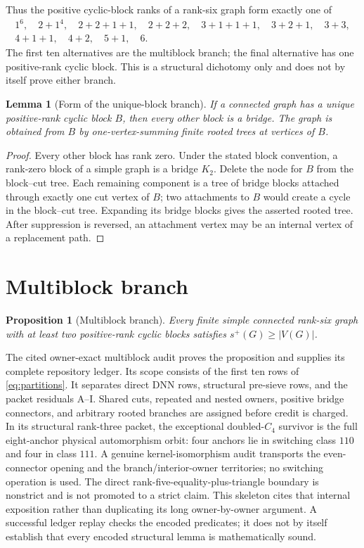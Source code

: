 \documentclass[11pt]{article}
\newtheorem{lemma}[theorem]{Lemma}
\newtheorem{proposition}[theorem]{Proposition}
\theoremstyle{definition}
\theoremstyle{remark}
\newcommand{\spn}{s^+}
\begin{document}
Thus the positive cyclic-block ranks of a rank-six graph form exactly one of
\begin{gather}\label{eq:partitions}
 1^6,\quad2+1^4,\quad2+2+1+1,\quad2+2+2,\quad3+1+1+1,\quad
 3+2+1,\quad3+3,\nonumber\\
 4+1+1,\quad4+2,\quad5+1,\quad6.
\end{gather}
The first ten alternatives are the multiblock branch; the final alternative has one
positive-rank cyclic block.  This is a structural dichotomy only and does not
by itself prove either branch.

\begin{lemma}[Form of the unique-block branch]\label{lem:unique-block-form}
If a connected graph has a unique positive-rank cyclic block $B$, then every
other block is a bridge.  The graph is obtained from $B$ by one-vertex-summing
finite rooted trees at vertices of $B$.
\end{lemma}
\begin{proof}
Every other block has rank zero.  Under the stated block convention, a
rank-zero block of a simple graph is a bridge $K_2$.  Delete the node for $B$
from the block--cut tree.  Each remaining component is a tree of bridge blocks
attached through exactly one cut vertex of $B$; two attachments to $B$ would
create a cycle in the block--cut tree.  Expanding its bridge blocks gives the
asserted rooted tree.  After suppression is reversed, an attachment vertex may
be an internal vertex of a replacement path.
\end{proof}

\section{Multiblock branch}

\begin{proposition}[Multiblock branch]\label{prop:multiblock}
Every finite simple connected rank-six graph with at least two positive-rank
cyclic blocks satisfies $\spn(G)\ge|V(G)|$.
\end{proposition}

The cited owner-exact multiblock audit \cite{MultiblockAudit} proves the
proposition and supplies its complete repository ledger.  Its scope consists of
the first ten rows of \eqref{eq:partitions}.  It separates direct DNN rows,
structural pre-sieve rows, and the packet residuals A--I.  Shared cuts,
repeated and nested owners, positive bridge connectors, and arbitrary rooted
branches are assigned before credit is charged.  In its structural rank-three
packet, the exceptional doubled-$C_4$ survivor is the full eight-anchor
physical automorphism orbit: four anchors lie in switching class $110$ and
four in class $111$.  A genuine kernel-isomorphism audit transports the even-
connector opening and the branch/interior-owner territories; no switching
operation is used.  The direct rank-five-equality-plus-triangle boundary is
nonstrict and is not promoted to a strict claim.  This skeleton cites that internal exposition rather than
duplicating its long owner-by-owner argument.  A successful ledger replay
checks the encoded predicates; it does not by itself establish that every
encoded structural lemma is mathematically sound.
\end{document}
